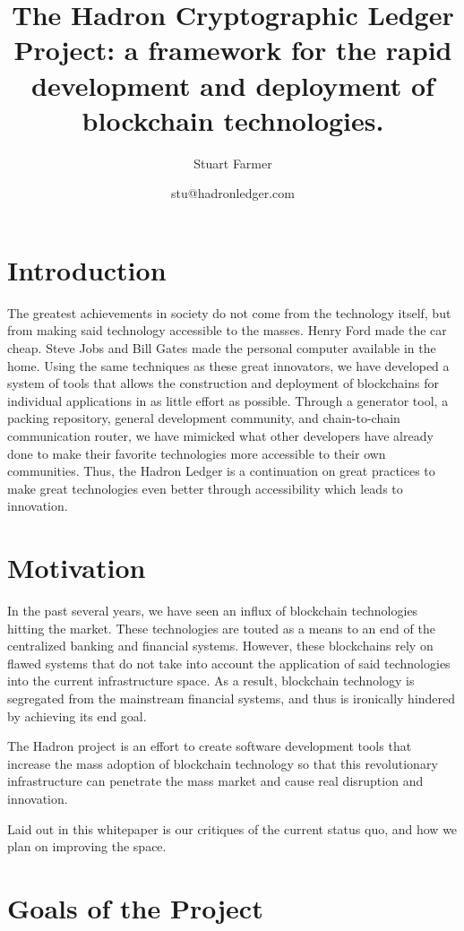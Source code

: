 \documentclass{article}
\title{The Hadron Cryptographic Ledger Project: a framework for the rapid development and deployment of blockchain technologies.}
\author{Stuart Farmer }
\date{stu@hadronledger.com}
\begin{document}
\maketitle

\section{Introduction}
The greatest achievements in society do not come from the technology itself, but from making said technology accessible to the masses. Henry Ford made the car cheap. Steve Jobs and Bill Gates made the personal computer available in the home. Using the same techniques as these great innovators, we have developed a system of tools that allows the construction and deployment of blockchains for individual applications in as little effort as possible. Through a generator tool, a packing repository, general development community, and chain-to-chain communication router, we have mimicked what other developers have already done to make their favorite technologies more accessible to their own communities. Thus, the Hadron Ledger is a continuation on great practices to make great technologies even better through accessibility which leads to innovation.

\section{Motivation}

In the past several years, we have seen an influx of blockchain technologies hitting the market. These technologies are touted as a means to an end of the centralized banking and financial systems. However, these blockchains rely on flawed systems that do not take into account the application of said technologies into the current infrastructure space. As a result, blockchain technology is segregated from the mainstream financial systems, and thus is ironically hindered by achieving its end goal.

The Hadron project is an effort to create software development tools that increase the mass adoption of blockchain technology so that this revolutionary infrastructure can penetrate the mass market and cause real disruption and innovation.

Laid out in this whitepaper is our critiques of the current status quo, and how we plan on improving the space.

\section{Goals of the Project}
\end{document}
